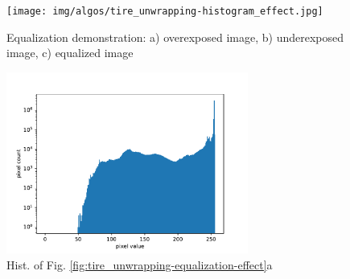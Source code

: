 \begin{figure}
    \centering
    \begin{minipage}[c]{0.5\linewidth}
        \texttt{[image: img/algos/tire\_unwrapping-histogram\_effect.jpg]}
        \caption{Equalization demonstration: a) overexposed image, b) underexposed image, c) equalized image}
        \label{fig:tire_unwrapping-equalization-effect}
    \end{minipage}\hfill
    \begin{minipage}[c]{0.5\linewidth}
        \centering
        \includegraphics[width=7.95cm, keepaspectratio]{img/algos/tire_unwrapping-histogram_effect-hist_a.pdf}
            \caption{Hist. of Fig. \ref{fig:tire_unwrapping-equalization-effect}a}
            \label{fig:tire_unwrapping-hist_of_equalization_effect_a}
    \end{minipage}\hfill
\end{figure}

